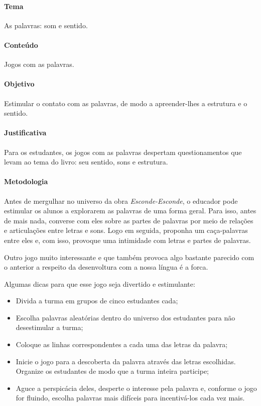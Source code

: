 \documentclass[11pt]{extarticle}
\begin{document}
\paragraph{Tema} As palavras: som e sentido. 

\paragraph{Conteúdo} Jogos com as palavras. 

\paragraph{Objetivo} Estimular o contato com as palavras, de modo a apreender-lhes a estrutura e o sentido. 

\paragraph{Justificativa} Para os estudantes, os jogos com as palavras despertam questionamentos que levam ao tema do livro: seu sentido, sons e estrutura.   

\paragraph{Metodologia} Antes de mergulhar no universo da obra \textit{Esconde-Esconde}, o educador pode estimular os alunos a explorarem as palavras de uma forma geral. Para isso, antes de mais nada, converse com eles sobre as partes de palavras por meio de relações e articulações entre letras e sons. Logo em seguida, proponha um caça-palavras entre eles e, com isso, provoque uma intimidade com letras e partes de palavras. 



Outro jogo muito interessante e que também provoca algo bastante parecido com o anterior a respeito da desenvoltura com a nossa língua é a forca. 

Algumas dicas para que esse jogo seja divertido e estimulante: 


\begin{itemize}
\item Divida a turma em grupos de cinco estudantes cada;
\item Escolha palavras aleatórias dentro do universo dos estudantes para não desestimular a turma;
\item Coloque as linhas correspondentes a cada uma das letras da palavra; 
\item Inicie o jogo para a descoberta da palavra através das letras escolhidas. Organize os estudantes de modo que a turma inteira participe;
\item Aguce a perspicácia deles, desperte o interesse pela palavra e, conforme o jogo for fluindo, escolha palavras mais difíceis para incentivá-los cada vez mais.

\end{itemize}
\end{document}

